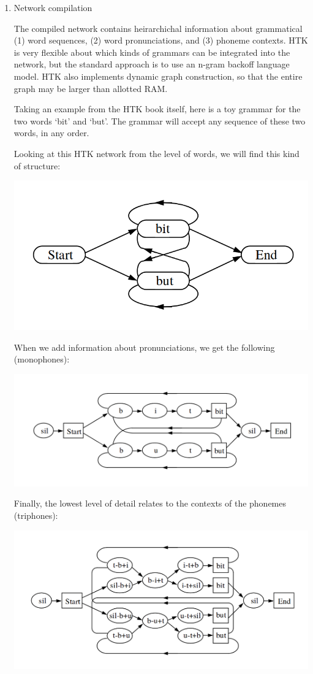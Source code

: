 \documentclass[10pt,a4paper]{article}
\begin{document}
\begin{enumerate}
\item Network compilation

  The compiled network contains heirarchichal information about grammatical (1) word sequences, (2) word pronunciations, and (3) phoneme contexts. HTK is very flexible about which kinds of grammars can be integrated into the network, but the standard approach is to use an n-gram backoff language model. HTK also implements dynamic graph construction, so that the entire graph may be larger than allotted RAM.

  Taking an example from the HTK book itself, here is a toy grammar for the two words `bit' and `but'. The grammar will accept any sequence of these two words, in any order.

  Looking at this HTK network from the level of words, we will find this kind of structure:
  
  \begin{center}
    \includegraphics[width=.5\textwidth,keepaspectratio]{figs/htk-graph-word.png}
  \end{center}

  When we add information about pronunciations, we get the following (monophones):

  \begin{center}
    \includegraphics[width=.7\textwidth,keepaspectratio]{figs/htk-graph-mono.png}
  \end{center}

  Finally, the lowest level of detail relates to the contexts of the phonemes (triphones):

  \begin{center}
    \includegraphics[width=.7\textwidth,keepaspectratio]{figs/htk-graph-tri.png}
  \end{center}



\end{enumerate}
\end{document}
